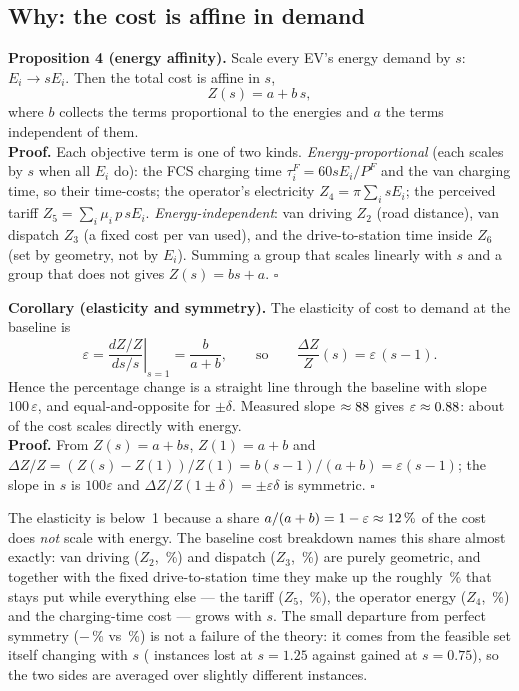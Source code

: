 
\subsection{Why: the cost is affine in demand}

\begin{keybox}
\textbf{Proposition 4 (energy affinity).} Scale every EV's energy demand by $s$: $E_i\!\to\! sE_i$. Then the total cost is affine in $s$,
\[
Z(s)=a+b\,s,
\]
where $b$ collects the terms proportional to the energies and $a$ the terms independent of them.\\[2pt]
\textbf{Proof.} Each objective term is one of two kinds. \emph{Energy-proportional} (each scales by $s$ when all $E_i$ do): the FCS charging time $\tau^F_i=60sE_i/P^F$ and the van charging time, so their time-costs; the operator's electricity $Z_4=\pi\sum_i sE_i$; the perceived tariff $Z_5=\sum_i \mu_i\,p\,sE_i$. \emph{Energy-independent}: van driving $Z_2$ (road distance), van dispatch $Z_3$ (a fixed cost per van used), and the drive-to-station time inside $Z_6$ (set by geometry, not by $E_i$). Summing a group that scales linearly with $s$ and a group that does not gives $Z(s)=bs+a$. $\square$
\end{keybox}

\begin{keybox}
\textbf{Corollary (elasticity and symmetry).} The elasticity of cost to demand at the baseline is
\[
\varepsilon=\left.\frac{dZ/Z}{ds/s}\right|_{s=1}=\frac{b}{a+b},
\qquad\text{so}\qquad
\frac{\Delta Z}{Z}(s)=\varepsilon\,(s-1).
\]
Hence the percentage change is a straight line through the baseline with slope $100\,\varepsilon$, and equal-and-opposite for $\pm\delta$. Measured slope $\approx88$ gives $\varepsilon\approx0.88$: about \feTenElastic{} of the cost scales directly with energy.\\[2pt]
\textbf{Proof.} From $Z(s)=a+bs$, $Z(1)=a+b$ and $\Delta Z/Z=(Z(s)-Z(1))/Z(1)=b(s-1)/(a+b)=\varepsilon(s-1)$; the slope in $s$ is $100\varepsilon$ and $\Delta Z/Z(1\pm\delta)=\pm\varepsilon\delta$ is symmetric. $\square$
\end{keybox}

The elasticity is below~1 because a share $a/(a+b)=1-\varepsilon\approx12\,\%$ of the cost does \emph{not} scale with energy. The baseline cost breakdown names this share almost exactly: van driving ($Z_2$, \fshareZTwo\,\%) and dispatch ($Z_3$, \fshareZThree\,\%) are purely geometric, and together with the fixed drive-to-station time they make up the roughly \feTenNonElastic\,\% that stays put while everything else --- the tariff ($Z_5$, \fshareZFive\,\%), the operator energy ($Z_4$, \fshareZFour\,\%) and the charging-time cost --- grows with $s$. The small departure from perfect symmetry ($-$\feTenDownDzAbs\,\% vs \feTenUpDz\,\%) is not a failure of the theory: it comes from the feasible set itself changing with $s$ (\feTenUpLost{} instances lost at $s=1.25$ against \feTenDownGain{} gained at $s=0.75$), so the two sides are averaged over slightly different instances.

